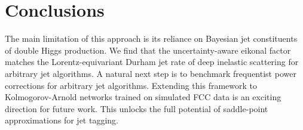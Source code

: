 \section{Conclusions}\label{sec:conclusions}

The main limitation of this approach is its reliance on Bayesian jet
constituents of double Higgs production. We find that the
uncertainty-aware eikonal factor matches the Lorentz-equivariant Durham
jet rate of deep inelastic scattering for arbitrary jet algorithms. A
natural next step is to benchmark frequentist power corrections for
arbitrary jet algorithms. Extending this framework to Kolmogorov-Arnold
networks trained on simulated FCC data is an exciting direction for
future work. This unlocks the full potential of saddle-point
approximations for jet tagging.

